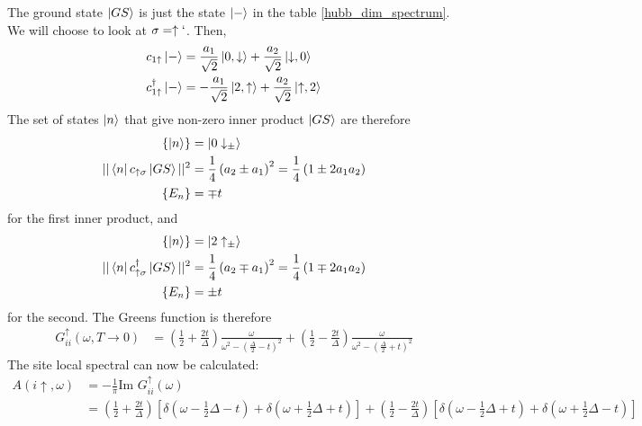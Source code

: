 \documentclass[12pt]{article}
\numberwithin{equation}{section}
\begin{document}
The ground state $\ket{GS}$ is just the state $\ket{-}$ in the table \ref{hubb_dim_spectrum}. We will choose to look at $\sigma = \uparrow`$. Then,
\begin{equation}\begin{aligned}
	c_{1\uparrow}\ket{-} &= \frac{a_1}{\sqrt 2}\ket{0, \downarrow} + \frac{a_2}{\sqrt 2}\ket{\downarrow,0}\\
	c^\dagger_{1\uparrow}\ket{-} &= -\frac{a_1}{\sqrt 2}\ket{2, \uparrow} + \frac{a_2}{\sqrt 2}\ket{\uparrow,2}\\
\end{aligned}\end{equation}
The set of states $\ket{n}$ that give non-zero inner product $\ket{GS}$ are therefore
\begin{equation}\begin{aligned}
	\left\{ \ket{n} \right\} &= \ket{0\downarrow_\pm}\\
	||\bra{n}c_{\uparrow\sigma}\ket{GS}||^2 &= \frac{1}{4}\left(a_2 \pm a_1 \right)^2 = \frac{1}{4}\left(1 \pm 2a_1a_2\right)\\
	\left\{ E_n \right\} &= \mp t
\end{aligned}\end{equation}
for the first inner product, and
\begin{equation}\begin{aligned}
	\left\{\ket{n}\right\} &= \ket{2\uparrow_\pm}\\
	||\bra{n}c^\dagger_{\uparrow\sigma}\ket{GS}||^2 &= \frac{1}{4}\left( a_2 \mp a_1 \right)^2 = \frac{1}{4}\left(1 \mp 2a_1a_2\right)\\
	\left\{ E_n \right\} &= \pm t
\end{aligned}\end{equation}
for the second. The Greens function is therefore
\begin{equation}\begin{aligned}
	\label{dimer_local_G}
	G_{i i}^\uparrow(\omega, T \to 0) &= \left( \frac{1}{2} + \frac{2t}{\Delta} \right) \frac{\omega}{\omega^2 - \left(\frac{\Delta}{2} - t\right) ^2} + \left( \frac{1}{2} - \frac{2t}{\Delta} \right) \frac{\omega}{\omega^2 - \left(\frac{\Delta}{2} + t\right) ^2}
\end{aligned}\end{equation}
The site local spectral can now be calculated:
\begin{equation}\begin{aligned}
	A(i\uparrow, \omega) &= - \frac{1}{\pi}\text{Im }G_{i i}^\uparrow(\omega)\\
			     &= \left( \frac{1}{2} + \frac{2t}{\Delta} \right)\left[\delta(\omega - \frac{1}{2}\Delta - t) + \delta(\omega + \frac{1}{2}\Delta + t)\right] + \left( \frac{1}{2} - \frac{2t}{\Delta} \right) \left[\delta(\omega - \frac{1}{2}\Delta + t) + \delta(\omega + \frac{1}{2}\Delta - t)\right]
\end{aligned}\end{equation}
\end{document}
